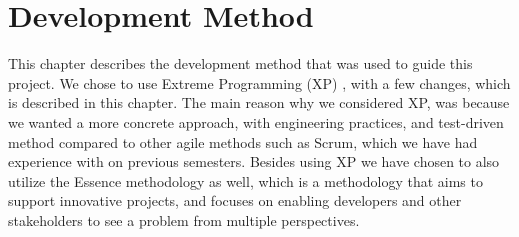 
\chapter{Development Method}
\label{cha:development_method}

This chapter describes the development method that was used to guide this project. We chose to use Extreme Programming (XP) \parencite{xp}, with a few changes, which is described in this chapter. The main reason why we considered XP, was because we wanted a more concrete approach, with engineering practices, and test-driven method compared to other agile methods such as Scrum, which we have had experience with on previous semesters. Besides using XP we have chosen to also utilize the Essence methodology as well, which is a methodology that aims to support innovative projects, and focuses on enabling developers and other stakeholders to see a problem from multiple perspectives. 






